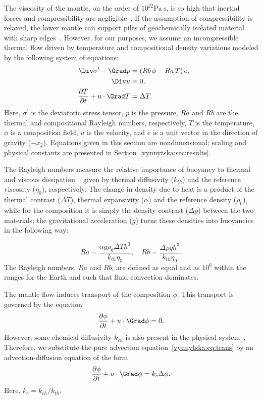 The viscosity of the mantle, on the order of $10^{22} \mathrm{Pa~s}$,
is so high that inertial forces and compressibility are
negligible~\citep{Ricard2009}. If the assumption of compressibility is
relaxed, the lower mantle can support piles of geochemically isolated
material with sharp edges~\citep{TanGurnis2005}. However, for our
purposes, we assume an incompressible thermal flow driven by
temperature and compositional density variations modeled by the
following system of equations:
\begin{align}
  \label{vynnytska:eq:momentum}
  - \Div \sigma^{\prime} - \Grad p
  &=  \left( Rb \, \phi - Ra \, T \right) e,\\
  \label{vynnytska:eq:incompress}
  \Div u & =  0,\\
  \label{vynnytska:eq:energy}
  \frac{\partial T}{\partial t} + u \cdot \Grad T & =  \Delta T.
\end{align}
Here, $\sigma^{\prime}$ is the deviatoric stress tensor, $p$ is the
pressure, $Ra$ and $Rb$ are the thermal and compositional Rayleigh
numbers, respectively, $T$ is the temperature, $\phi$ is a composition
field, $u$ is the velocity, and $e$ is a unit vector in the direction
of gravity ($-x_2$). Equations given in this section are
nondimensional; scaling and physical constants are presented in
Section~\ref{vynnytska:sec:results}.

The Rayleigh numbers measure the relative importance of buoyancy to
thermal and viscous dissipation ~\citep{KennettBunge2008} given by
thermal diffusivity ($k_{th}$) and the reference viscosity ($\eta_0$),
respectively.  The change in density due to heat is a product of the
thermal contrast ($\Delta T$), thermal expansivity ($\alpha$) and the
reference density ($\rho_0$), while for the composition it is simply
the density contrast ($\Delta \rho$) between the two materials; the
gravitational acceleration ($g$) turns these densities into buoyancies
in the following way:

\begin{equation}
  Ra = \frac{\alpha g \rho_0 \Delta T h^3}{k_{th} \eta_0},  \quad
  Rb = \frac{\Delta \rho g h^3}{k_{th} \eta_0}.
\end{equation}
The Rayleigh numbers, $Ra$ and $Rb$, are defined as equal and as
$10^{6}$ within the ranges for the
Earth \citep{MontagueKelloggManga1998} and such that fluid convection
dominates.

The mantle flow induces transport of the composition $\phi$. This
transport is governed by the equation
\begin{equation}
  \label{vynnytska:eq:trans}
  \frac{\partial \phi}{\partial t} +  u \cdot \Grad \phi = 0.
\end{equation}
However, some chemical diffusivity $k_{ch}$ is also present in the
physical system~\citep{KekenEtAl1997, HansenYuen1988}. Therefore, we
substitute the pure advection equation~\eqref{vynnytska:eq:trans} by
an advection-diffusion equation of the form
\begin{equation}
  \label{vynnytska:eq:transdif}
  \frac{\partial \phi}{\partial t}
  + u  \cdot \Grad \phi =  k_c \Delta \phi .
\end{equation}
Here, $k_c = k_{ch}/k_{th}$.

